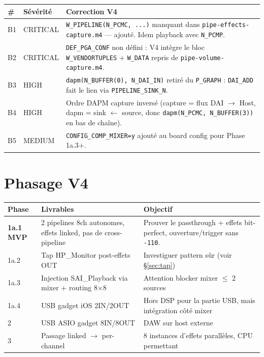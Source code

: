 \documentclass[11pt,a4paper]{article}
\begin{document}
\begin{center}
\begin{tabularx}{\textwidth}{llX}
\toprule
\textbf{\#} & \textbf{Sévérité} & \textbf{Correction V4} \\
\midrule
B1 & CRITICAL & \texttt{W\_PIPELINE(N\_PCMC, ...)} manquant dans \texttt{pipe-effects-capture.m4} --- ajouté. Idem playback avec \texttt{N\_PCMP}. \\
B2 & CRITICAL & \texttt{DEF\_PGA\_CONF} non défini : V4 intègre le bloc \texttt{W\_VENDORTUPLES} + \texttt{W\_DATA} repris de \texttt{pipe-volume-capture.m4}. \\
B3 & HIGH & \texttt{dapm(N\_BUFFER(0), N\_DAI\_IN)} retiré du \texttt{P\_GRAPH} : \texttt{DAI\_ADD} fait le lien via \texttt{PIPELINE\_SINK\_N}. \\
B4 & HIGH & Ordre DAPM capture inversé (capture = flux DAI $\to$ Host, dapm = sink $\leftarrow$ source, donc \texttt{dapm(N\_PCMC, N\_BUFFER(3))} en bas de chaîne). \\
B5 & MEDIUM & \texttt{CONFIG\_COMP\_MIXER=y} ajouté au board config pour Phase 1a.3+. \\
\bottomrule
\end{tabularx}
\end{center}

\section{Phasage V4}

\begin{center}
\begin{tabularx}{\textwidth}{llX}
\toprule
\textbf{Phase} & \textbf{Livrables} & \textbf{Objectif} \\
\midrule
\textbf{1a.1 MVP} & 2 pipelines 8ch autonomes, effets linked, pas de cross-pipeline & Prouver le passthrough + effets bit-perfect, ouverture/trigger sans \texttt{-110}. \\
1a.2 & Tap HP\_Monitor post-effets OUT & Investiguer pattern sûr (voir \S\ref{sec:tap}) \\
1a.3 & Injection SAI\_Playback via mixer + routing 8×8 & Attention blocker mixer $\leq$ 2 sources \\
1a.4 & USB gadget iOS 2IN/2OUT & Hors DSP pour la partie USB, mais intégration côté mixer \\
2 & USB ASIO gadget 8IN/8OUT & DAW sur host externe \\
3 & Passage linked $\to$ per-channel & 8 instances d'effets parallèles, CPU permettant \\
\bottomrule
\end{tabularx}
\end{center}
\end{document}
